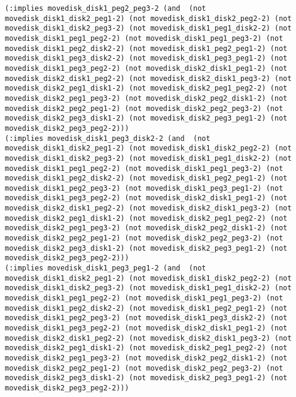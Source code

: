 \documentclass[12pt,letterpaper]{ntdhw}
\begin{document}
\begin{enumerate}
\begin{enumerate}
\begin{lstlisting}[language=pddl, style=pddlstyle,
  basicstyle=\scriptsize]
(:implies movedisk_disk1_peg2_peg3-2 (and  (not movedisk_disk1_disk2_peg1-2) (not movedisk_disk1_disk2_peg2-2) (not movedisk_disk1_disk2_peg3-2) (not movedisk_disk1_peg1_disk2-2) (not movedisk_disk1_peg1_peg2-2) (not movedisk_disk1_peg1_peg3-2) (not movedisk_disk1_peg2_disk2-2) (not movedisk_disk1_peg2_peg1-2) (not movedisk_disk1_peg3_disk2-2) (not movedisk_disk1_peg3_peg1-2) (not movedisk_disk1_peg3_peg2-2) (not movedisk_disk2_disk1_peg1-2) (not movedisk_disk2_disk1_peg2-2) (not movedisk_disk2_disk1_peg3-2) (not movedisk_disk2_peg1_disk1-2) (not movedisk_disk2_peg1_peg2-2) (not movedisk_disk2_peg1_peg3-2) (not movedisk_disk2_peg2_disk1-2) (not movedisk_disk2_peg2_peg1-2) (not movedisk_disk2_peg2_peg3-2) (not movedisk_disk2_peg3_disk1-2) (not movedisk_disk2_peg3_peg1-2) (not movedisk_disk2_peg3_peg2-2)))
(:implies movedisk_disk1_peg3_disk2-2 (and  (not movedisk_disk1_disk2_peg1-2) (not movedisk_disk1_disk2_peg2-2) (not movedisk_disk1_disk2_peg3-2) (not movedisk_disk1_peg1_disk2-2) (not movedisk_disk1_peg1_peg2-2) (not movedisk_disk1_peg1_peg3-2) (not movedisk_disk1_peg2_disk2-2) (not movedisk_disk1_peg2_peg1-2) (not movedisk_disk1_peg2_peg3-2) (not movedisk_disk1_peg3_peg1-2) (not movedisk_disk1_peg3_peg2-2) (not movedisk_disk2_disk1_peg1-2) (not movedisk_disk2_disk1_peg2-2) (not movedisk_disk2_disk1_peg3-2) (not movedisk_disk2_peg1_disk1-2) (not movedisk_disk2_peg1_peg2-2) (not movedisk_disk2_peg1_peg3-2) (not movedisk_disk2_peg2_disk1-2) (not movedisk_disk2_peg2_peg1-2) (not movedisk_disk2_peg2_peg3-2) (not movedisk_disk2_peg3_disk1-2) (not movedisk_disk2_peg3_peg1-2) (not movedisk_disk2_peg3_peg2-2)))
(:implies movedisk_disk1_peg3_peg1-2 (and  (not movedisk_disk1_disk2_peg1-2) (not movedisk_disk1_disk2_peg2-2) (not movedisk_disk1_disk2_peg3-2) (not movedisk_disk1_peg1_disk2-2) (not movedisk_disk1_peg1_peg2-2) (not movedisk_disk1_peg1_peg3-2) (not movedisk_disk1_peg2_disk2-2) (not movedisk_disk1_peg2_peg1-2) (not movedisk_disk1_peg2_peg3-2) (not movedisk_disk1_peg3_disk2-2) (not movedisk_disk1_peg3_peg2-2) (not movedisk_disk2_disk1_peg1-2) (not movedisk_disk2_disk1_peg2-2) (not movedisk_disk2_disk1_peg3-2) (not movedisk_disk2_peg1_disk1-2) (not movedisk_disk2_peg1_peg2-2) (not movedisk_disk2_peg1_peg3-2) (not movedisk_disk2_peg2_disk1-2) (not movedisk_disk2_peg2_peg1-2) (not movedisk_disk2_peg2_peg3-2) (not movedisk_disk2_peg3_disk1-2) (not movedisk_disk2_peg3_peg1-2) (not movedisk_disk2_peg3_peg2-2)))

\end{lstlisting}
\end{enumerate}
\end{enumerate}
\end{document}
